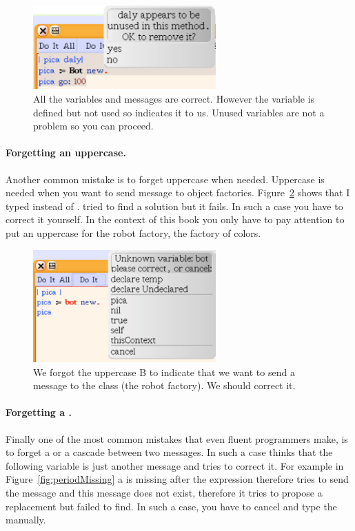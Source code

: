 \begin{figure}[h]
\begin{center}\includegraphics[width=7cm]{unusedVariables}
\caption{All the variables and messages are correct. However the variable  is  defined but not used so \sq indicates it to us. Unused variables are not a problem so you can proceed.\label{fig:unusedVariables}}\end{center}
\end{figure}

\paragraph{Forgetting an uppercase.} Another common mistake is to forget uppercase when needed. Uppercase is needed when you want to send message to object factories. Figure~\ref{fig:TMissing} shows that I typed  instead of . \sq tried to find a solution but it fails. In such a case you have to correct it yourself. In the context of this book you only have to pay attention to put an uppercase for  the robot factory,  the factory of colors.


\begin{figure}
\begin{center}\includegraphics[width=7cm]{BMissing}
\caption{We forgot the uppercase B  to indicate that we want to send a message to the class (the robot factory). We should correct it. \label{fig:TMissing}}\end{center}
\end{figure}


\paragraph{Forgetting a \period.} Finally one of the most common mistakes that even fluent programmers make, is to forget a \period or a cascade between two messages. In such a case \sq thinks that the following variable is just another message and tries to correct it. For example in Figure~\ref{fig:periodMissing} a \period is missing after the expression  therefore \sq tries to send the message  and this message does not exist, therefore it tries to propose a replacement but failed to find. In such a case, you have to cancel and type the \period manually.

